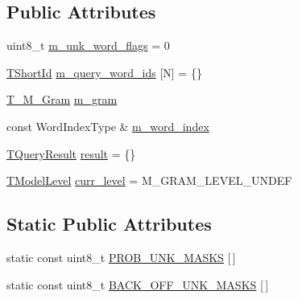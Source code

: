 \subsection*{Public Attributes}
\begin{DoxyCompactItemize}
\item 
uint8\+\_\+t \hyperlink{structuva_1_1smt_1_1tries_1_1_m_gram_query_a17a3df5da9053f4707cbe9ce9022a3a9}{m\+\_\+unk\+\_\+word\+\_\+flags} = 0
\item 
\hyperlink{namespaceuva_1_1smt_1_1hashing_adcf22e1982ad09d3a63494c006267469}{T\+Short\+Id} \hyperlink{structuva_1_1smt_1_1tries_1_1_m_gram_query_a338ab0c27946bcf49d7e08328efe4eeb}{m\+\_\+query\+\_\+word\+\_\+ids} \mbox{[}N\mbox{]} = \{\}
\item 
\hyperlink{structuva_1_1smt_1_1tries_1_1mgrams_1_1_t___m___gram}{T\+\_\+\+M\+\_\+\+Gram} \hyperlink{structuva_1_1smt_1_1tries_1_1_m_gram_query_af832570ab51678eb51b440a6af1fff71}{m\+\_\+gram}
\item 
const Word\+Index\+Type \& \hyperlink{structuva_1_1smt_1_1tries_1_1_m_gram_query_a71bbc83cb8c6487b7bed52bf10aa1014}{m\+\_\+word\+\_\+index}
\item 
\hyperlink{structuva_1_1smt_1_1tries_1_1_t_query_result}{T\+Query\+Result} \hyperlink{structuva_1_1smt_1_1tries_1_1_m_gram_query_af99d0de8ec2e4087a38a7a6b58b1f298}{result} = \{\}
\item 
\hyperlink{namespaceuva_1_1smt_1_1tries_a20577a44b3a42d26524250634379b7cb}{T\+Model\+Level} \hyperlink{structuva_1_1smt_1_1tries_1_1_m_gram_query_a18e8f32cf23f0f6b1ccd13acc1025d0b}{curr\+\_\+level} = M\+\_\+\+G\+R\+A\+M\+\_\+\+L\+E\+V\+E\+L\+\_\+\+U\+N\+D\+E\+F
\end{DoxyCompactItemize}
\subsection*{Static Public Attributes}
\begin{DoxyCompactItemize}
\item 
static const uint8\+\_\+t \hyperlink{structuva_1_1smt_1_1tries_1_1_m_gram_query_abf8a827fe84d185152b2b9330228be5b}{P\+R\+O\+B\+\_\+\+U\+N\+K\+\_\+\+M\+A\+S\+K\+S} \mbox{[}$\,$\mbox{]}
\item 
static const uint8\+\_\+t \hyperlink{structuva_1_1smt_1_1tries_1_1_m_gram_query_af4c69c044fa5e5f371c743fe14b6572b}{B\+A\+C\+K\+\_\+\+O\+F\+F\+\_\+\+U\+N\+K\+\_\+\+M\+A\+S\+K\+S} \mbox{[}$\,$\mbox{]}
\end{DoxyCompactItemize}


